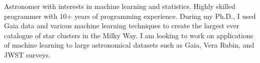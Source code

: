 Astronomer with interests in machine learning and statistics. Highly skilled programmer with 10+ years of programming experience. During my Ph.D., I used Gaia data and various machine learning techniques to create the largest ever catalogue of star clusters in the Milky Way. I am looking to work on applications of machine learning to large astronomical datasets such as Gaia, Vera Rubin, and JWST surveys.